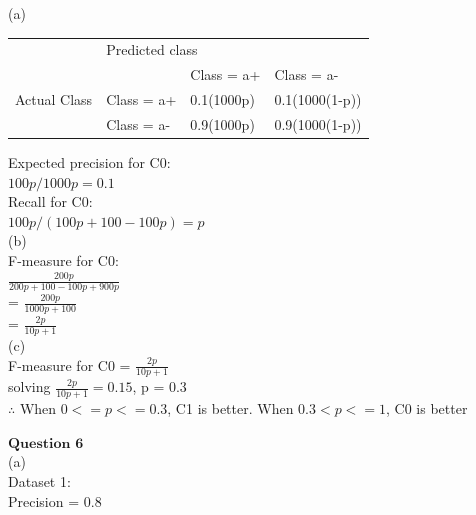 \documentclass[12pt]{article}
\begin{document}
(a)\\

\begin{table}[]
\begin{tabular}{llll}
                              & \multicolumn{3}{l}{Predicted class}     \\
\multirow{3}{*}{Actual Class} &            & Class = a+    & Class = a- \\
                              & Class = a+ & 0.1(1000p)         & 0.1(1000(1-p))  \\
                              & Class = a- & 0.9(1000p) & 0.9(1000(1-p)) 
\end{tabular}
\end{table}


Expected precision for C0: \\

$100p/ 1000p = 0.1$\\

Recall for C0:\\

$100p/(100p+100-100p) = p$\\


(b)\\

F-measure for C0: \\

$\frac{200p}{200p+100-100p+900p}$\\

= $\frac{200p}{1000p+100}$\\

= $\frac{2p}{10p+1}$\\

(c)\\


F-measure for C0 = $\frac{2p}{10p+1}$\\

solving $\frac{2p}{10p+1} = 0.15$, p = 0.3\\

$\therefore$ When $0 <= p <= 0.3$, C1 is better. When $0.3 < p <= 1$, C0 is better\\


\newpage

$\textbf{Question 6}$\\

(a)\\

Dataset 1:\\

Precision = 0.8\\
\end{document}
